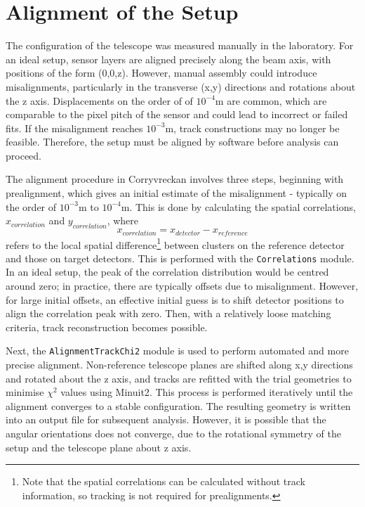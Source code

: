 
\chapter{Alignment of the Setup}
\label{appendix:align}

The configuration of the telescope was measured manually in the laboratory. For an ideal setup, sensor layers are aligned precisely along the beam axis, with positions of the form (0,0,z). However, manual assembly could introduce misalignments, particularly in the transverse (x,y) directions and rotations about the z axis. Displacements on the order of of $10^{-4}$m are common, which are comparable to the pixel pitch of the sensor and could lead to incorrect or failed fits. If the misalignment reaches $10^{-3}$m, track constructions may no longer be feasible. Therefore, the setup must be aligned by software before analysis can proceed. 

The alignment procedure in Corryvreckan involves three steps, beginning with prealignment, which gives an initial estimate of the misalignment - typically on the order of $10^{-3}$m to $10^{-4}$m. This is done by calculating the spatial correlations, $x_{correlation}$ and $y_{correlation}$, where
\begin{equation}
    x_{correlation} = x_{detector} - x_{reference}
    \label{eq:correlation}
\end{equation}
refers to the local spatial difference\footnote{Note that the spatial correlations can be calculated without track information, so tracking is not required for prealignments.} between clusters on the reference detector and those on target detectors. This is performed with the \texttt{Correlations} module. In an ideal setup, the peak of the correlation distribution would be centred around zero; in practice, there are typically offsets due to misalignment. However, for large initial offsets, an effective initial guess is to shift detector positions to align the correlation peak with zero. Then, with a relatively loose matching criteria, track reconstruction becomes possible.


Next, the \texttt{AlignmentTrackChi2} module is used to perform automated and more precise alignment. Non-reference telescope planes are shifted along x,y directions and rotated about the z axis, and tracks are refitted with the trial geometries to minimise $\chi^2$ values using Minuit2\cite{Minuit}. This process is performed iteratively until the alignment converges to a stable configuration. The resulting geometry is written into an output file for subsequent analysis. However, it is possible that the angular orientations does not converge, due to the rotational symmetry of the setup and the telescope plane about z axis. 

